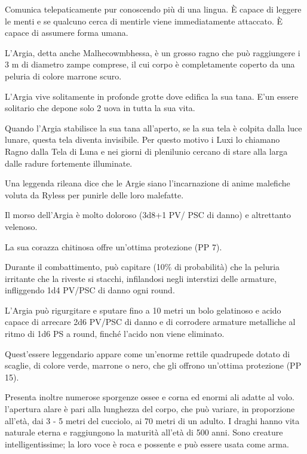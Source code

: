 Comunica telepaticamente pur conoscendo pi\`u di una lingua. \`E
capace di leggere le menti e se qualcuno cerca di mentirle viene
immediatamente attaccato. \`E capace di assumere forma umana.


L'Argia, detta anche Malhecowmbhessa, \`e un grosso ragno che pu\`o
raggiungere i 3 m di diametro zampe comprese, il cui corpo \`e
completamente coperto da una peluria di colore marrone scuro.

L'Argia vive solitamente in profonde grotte dove edifica la sua
tana.  E'un essere solitario che depone solo 2 uova in tutta la sua
vita.

Quando l'Argia stabilisce la sua tana all'aperto, se la sua tela \`e
colpita dalla luce lunare, questa tela diventa invisibile. Per questo
motivo i Luxi lo chiamano Ragno dalla Tela di Luna e nei giorni di
plenilunio cercano di stare alla larga dalle radure fortemente
illuminate.

Una leggenda rileana dice che le Argie siano l'incarnazione di anime
malefiche voluta da Ryless per punirle delle loro malefatte. 

Il morso dell'Argia \`e molto doloroso (3d8+1 PV/ PSC di danno) e
altrettanto velenoso.

La sua corazza chitinosa offre un'ottima protezione (PP 7).

Durante il combattimento, pu\`o capitare (10\% di probabilit\`a) che
la peluria irritante che la riveste si stacchi, infilandosi negli
interstizi delle armature, infliggendo 1d4 PV/PSC di danno ogni round.

L'Argia pu\`o rigurgitare e sputare fino a 10 metri un bolo gelatinoso
e acido capace di arrecare 2d6 PV/PSC di danno e di corrodere armature
metalliche al ritmo di 1d6 PS a round, finch\'e l'acido non viene
eliminato.


Quest'essere leggendario appare come un'enorme rettile quadrupede
dotato di scaglie, di colore verde, marrone o nero, che gli offrono
un'ottima protezione (PP 15). 


Presenta inoltre numerose sporgenze ossee e corna ed enormi ali adatte
al volo.  l'apertura alare \`e pari alla lunghezza del corpo, che
pu\`o variare, in proporzione all'et\`a, dai 3 - 5 metri del
cucciolo, ai 70 metri di un adulto. I draghi hanno vita naturale
eterna e raggiungono la maturit\`a all'et\`a di 500 anni. Sono
creature intelligentissime; la loro voce \`e roca e possente e
pu\`o essere usata come arma.

